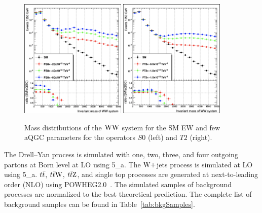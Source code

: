 \begin{figure}[!htbp]
\centering
\includegraphics[width=0.45\textwidth]{Plots/aQGC_Signal_Scaling/mWW_FS0.png}
\includegraphics[width=0.45\textwidth]{Plots/aQGC_Signal_Scaling/mWW_FT2.png}
\caption{Mass distributions of the $\mathrm{W} \mathrm{W}$ system for the SM EW and few aQGC parameters for the operators $S0$ (left) and $T2$ (right).}
\label{fig:aqgc_signal}
\end{figure}



The Drell--Yan process is simulated with one, two, three, and four outgoing partons at Born level at LO using \MADGRAPH{}5\_a\MCATNLO. The $\mathrm{W}+$jets process is simulated at LO using \MADGRAPH{}5\_a\MCATNLO. $t\bar{t}$, $t\bar{t} \mathrm{W}$, $t\bar{t} \mathrm{Z}$, and single top processes are generated at next-to-leading order (NLO) using \textsc{POWHEG2.0}~\cite{Alioli:2008gx,Nason:2004rx,Frixione:2007vw,powheg:2010}. The simulated samples of background processes are normalized to the best theoretical prediction. The complete list of background samples can be found in Table~\ref{tab:bkgSamples}.

